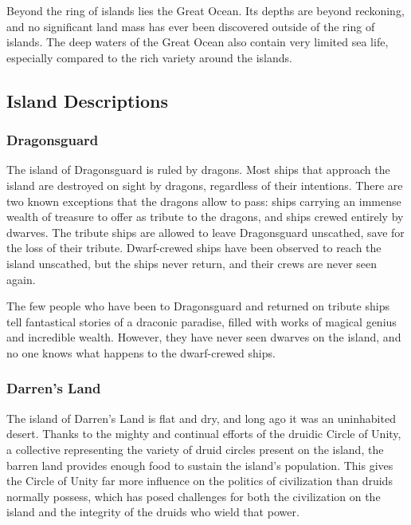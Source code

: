         Beyond the ring of islands lies the Great Ocean.
        Its depths are beyond reckoning, and no significant land mass has ever been discovered outside of the ring of islands.
        The deep waters of the Great Ocean also contain very limited sea life, especially compared to the rich variety around the islands.

    \subsection{Island Descriptions}

        \subsubsection{Dragonsguard}
            The island of Dragonsguard is ruled by dragons.
            Most ships that approach the island are destroyed on sight by dragons, regardless of their intentions.
            There are two known exceptions that the dragons allow to pass: ships carrying an immense wealth of treasure to offer as tribute to the dragons, and ships crewed entirely by dwarves.
            The tribute ships are allowed to leave Dragonsguard unscathed, save for the loss of their tribute.
            Dwarf-crewed ships have been observed to reach the island unscathed, but the ships never return, and their crews are never seen again.

            The few people who have been to Dragonsguard and returned on tribute ships tell fantastical stories of a draconic paradise, filled with works of magical genius and incredible wealth.
            However, they have never seen dwarves on the island, and no one knows what happens to the dwarf-crewed ships.

        \subsubsection{Darren's Land}
            The island of Darren's Land is flat and dry, and long ago it was an uninhabited desert.
            Thanks to the mighty and continual efforts of the druidic Circle of Unity, a collective representing the variety of druid circles present on the island, the barren land provides enough food to sustain the island's population.
            This gives the Circle of Unity far more influence on the politics of civilization than druids normally possess, which has posed challenges for both the civilization on the island and the integrity of the druids who wield that power.

